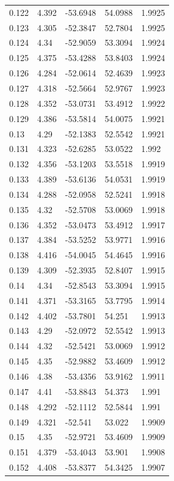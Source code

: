\begin{tabular}{lllll}
0.122 & 4.392 & -53.6948 & 54.0988 & 1.9925 \\
0.123 & 4.305 & -52.3847 & 52.7804 & 1.9925 \\
0.124 & 4.34 & -52.9059 & 53.3094 & 1.9924 \\
0.125 & 4.375 & -53.4288 & 53.8403 & 1.9924 \\
0.126 & 4.284 & -52.0614 & 52.4639 & 1.9923 \\
0.127 & 4.318 & -52.5664 & 52.9767 & 1.9923 \\
0.128 & 4.352 & -53.0731 & 53.4912 & 1.9922 \\
0.129 & 4.386 & -53.5814 & 54.0075 & 1.9921 \\
0.13 & 4.29 & -52.1383 & 52.5542 & 1.9921 \\
0.131 & 4.323 & -52.6285 & 53.0522 & 1.992 \\
0.132 & 4.356 & -53.1203 & 53.5518 & 1.9919 \\
0.133 & 4.389 & -53.6136 & 54.0531 & 1.9919 \\
0.134 & 4.288 & -52.0958 & 52.5241 & 1.9918 \\
0.135 & 4.32 & -52.5708 & 53.0069 & 1.9918 \\
0.136 & 4.352 & -53.0473 & 53.4912 & 1.9917 \\
0.137 & 4.384 & -53.5252 & 53.9771 & 1.9916 \\
0.138 & 4.416 & -54.0045 & 54.4645 & 1.9916 \\
0.139 & 4.309 & -52.3935 & 52.8407 & 1.9915 \\
0.14 & 4.34 & -52.8543 & 53.3094 & 1.9915 \\
0.141 & 4.371 & -53.3165 & 53.7795 & 1.9914 \\
0.142 & 4.402 & -53.7801 & 54.251 & 1.9913 \\
0.143 & 4.29 & -52.0972 & 52.5542 & 1.9913 \\
0.144 & 4.32 & -52.5421 & 53.0069 & 1.9912 \\
0.145 & 4.35 & -52.9882 & 53.4609 & 1.9912 \\
0.146 & 4.38 & -53.4356 & 53.9162 & 1.9911 \\
0.147 & 4.41 & -53.8843 & 54.373 & 1.991 \\
0.148 & 4.292 & -52.1112 & 52.5844 & 1.991 \\
0.149 & 4.321 & -52.541 & 53.022 & 1.9909 \\
0.15 & 4.35 & -52.9721 & 53.4609 & 1.9909 \\
0.151 & 4.379 & -53.4043 & 53.901 & 1.9908 \\
0.152 & 4.408 & -53.8377 & 54.3425 & 1.9907 \\

\end{tabular}
